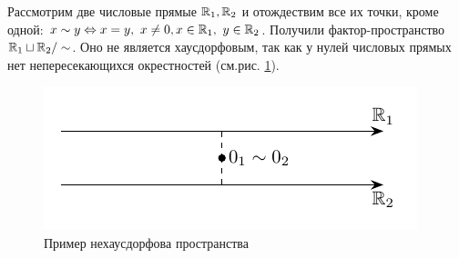 \begin{example}
    Рассмотрим две числовые прямые $\mathbb{R}_1, \mathbb{R}_2$ и отождествим все их точки, кроме одной: $x \sim y \Leftrightarrow x = y, \ x \ne 0, x \in \mathbb{R}_1, \ y \in \mathbb{R}_2$. 
    Получили фактор-пространство $\mathbb{R}_1 \sqcup \mathbb{R}_2 / \sim$.
    Оно не является хаусдорфовым, так как у нулей числовых прямых нет непересекающихся окрестностей (см.рис. \ref{fig:c2.1}).

    \begin{figure}
        \centering
        \includegraphics{images/c2.1.pdf}
        \caption{Пример нехаусдорфова пространства}
        \label{fig:c2.1}
    \end{figure}
\end{example}
